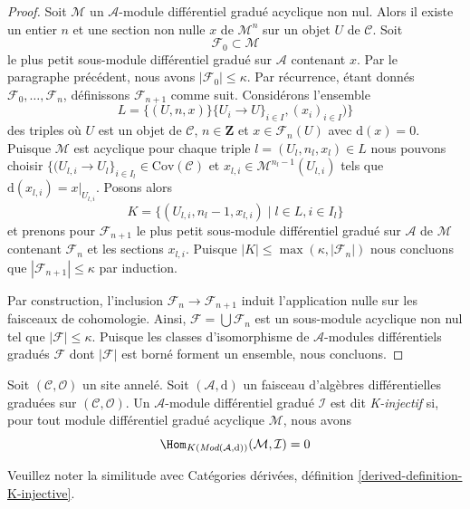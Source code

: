 \begin{proof}
\medskip\noindent
Soit $\mathcal{M}$ un $\mathcal{A}$-module différentiel gradué acyclique non nul.
Alors il existe un entier $n$ et une section non nulle $x$ de $\mathcal{M}^n$ sur un objet $U$ de $\mathcal{C}$. Soit
$$
\mathcal{F}_0 \subset \mathcal{M}
$$
le plus petit sous-module différentiel gradué sur $\mathcal{A}$ contenant $x$.
Par le paragraphe précédent, nous avons $|\mathcal{F}_0| \leq \kappa$.
Par récurrence, étant donnés $\mathcal{F}_0, \ldots, \mathcal{F}_n$, définissons $\mathcal{F}_{n + 1}$ comme suit.
Considérons l'ensemble
$$
L = \{(U, n, x)\}
\{U_i \to U\}_{i \in I}, (x_i)_{i \in I})\}
$$
des triples où $U$ est un objet de $\mathcal{C}$, $n \in \mathbf{Z}$ et $x \in \mathcal{F}_n(U)$ avec $\text{d}(x) = 0$.
Puisque $\mathcal{M}$ est acyclique pour chaque triple $l = (U_l, n_l, x_l) \in L$ nous pouvons choisir $\{(U_{l, i} \to U_l\}_{i \in I_l} \in \text{Cov}(\mathcal{C})$ et $x_{l, i} \in \mathcal{M}^{n_l - 1}(U_{l, i})$ tels que $\text{d}(x_{l, i}) = x|_{U_{l, i}}$.
Posons alors
$$
K = \{(U_{l, i}, n_l - 1, x_{l, i}) \mid l \in L, i \in I_l\}
$$
et prenons pour $\mathcal{F}_{n + 1}$ le plus petit sous-module différentiel gradué sur $\mathcal{A}$ de $\mathcal{M}$ contenant $\mathcal{F}_n$ et les sections $x_{l, i}$.
Puisque $|K| \leq \max(\kappa, |\mathcal{F}_n|)$ nous concluons que $|\mathcal{F}_{n + 1}| \leq \kappa$ par induction.

\medskip\noindent
Par construction, l'inclusion $\mathcal{F}_n \to \mathcal{F}_{n + 1}$ induit l'application nulle sur les faisceaux de cohomologie.
Ainsi, $\mathcal{F} = \bigcup \mathcal{F}_n$ est un sous-module acyclique non nul tel que $|\mathcal{F}| \leq \kappa$.
Puisque les classes d'isomorphisme de $\mathcal{A}$-modules différentiels gradués $\mathcal{F}$ dont $|\mathcal{F}|$ est borné forment un ensemble, nous concluons.
\end{proof}

\begin{definition}
\label{definition-K-injective}
Soit $(\mathcal{C}, \mathcal{O})$ un site annelé.
Soit $(\mathcal{A}, \text{d})$ un faisceau d'algèbres différentielles graduées sur $(\mathcal{C}, \mathcal{O})$.
Un $\mathcal{A}$-module différentiel gradué $\mathcal{I}$ est dit {\it K-injectif} si, pour tout module différentiel gradué acyclique $\mathcal{M}$, nous avons
$$
\Hom_{K(\textit{Mod}(\mathcal{A}, \text{d}))}(\mathcal{M}, \mathcal{I}) = 0
$$
\end{definition}

\noindent
Veuillez noter la similitude avec Catégories dérivées, définition \ref{derived-definition-K-injective}.

